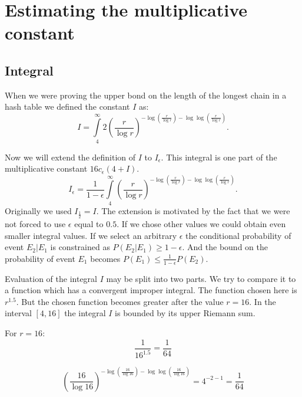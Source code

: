 \section{Estimating the multiplicative constant}

\subsection{Integral}
When we were proving the upper bond on the length of the longest chain in a hash table we defined the constant $I$ as:
\begin{displaymath}
I = \displaystyle\int\limits_4^\infty 2 \left(\frac{r}{\log r}\right)^{-\log \left(\frac{r}{\log r}\right) - \log \log \left(\frac{r}{\log r}\right)}\textit{.}
\end{displaymath}

Now we will extend the definition of $I$ to $I_{\epsilon}$. This integral is one part of the multiplicative constant $16c_\epsilon(4 + I)$.
\begin{displaymath}
I_{\epsilon} = \frac{1}{1 - \epsilon} \displaystyle\int\limits_4^\infty \left(\frac{r}{\log r}\right)^{-\log \left(\frac{r}{\log r}\right) - \log \log \left(\frac{r}{\log r}\right)}\textit{.}
\end{displaymath}
Originally we used $I_{\frac{1}{2}} = I$. The extension is motivated by the fact that we were not forced to use $\epsilon$ equal to $0.5$. If we chose other values we could obtain even smaller integral values. If we select an arbitrary $\epsilon$ the conditional probability of event $E_2 | E_1$ is constrained as $P(E_2 | E_1) \geq 1 - \epsilon$. And the bound on the probability of event $E_1$ becomes $P(E_1) \leq \frac{1}{1-\epsilon} P(E_2)$.

Evaluation of the integral $I$ may be split into two parts. We try to compare it to a function which has a convergent improper integral. The function chosen here is $r^{1.5}$. But the chosen function becomes greater after the value $r = 16$. In the interval $[4, 16]$ the integral $I$ is bounded by its upper Riemann sum.

For $r = 16$:
\begin{displaymath}
\frac{1}{16 ^ {1.5}} = \frac{1}{64}
\end{displaymath}

\begin{displaymath}
\left(\frac{16}{\log 16}\right)^{-\log \left(\frac{16}{\log 16}\right) - \log \log \left(\frac{16}{\log 16}\right)} = 4^{-2 - 1} = \frac{1}{64}
\end{displaymath}

